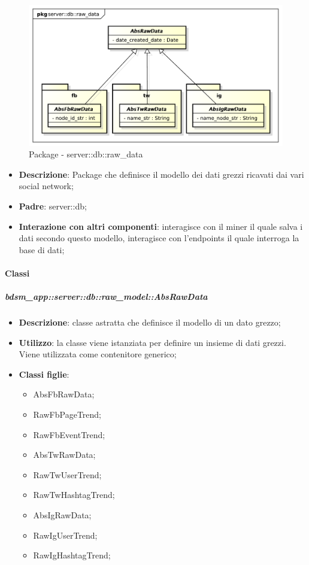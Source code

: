 	\begin{figure}[htbp]
		\centering
		\centerline{\includegraphics[scale=0.35]{./images/server/raw_data.pdf}}
		\caption{Package - server::db::raw\_data}
	\end{figure}
	\begin{itemize}
	\item \textbf{Descrizione}: Package che definisce il modello dei dati grezzi ricavati dai vari social network;
		\item \textbf{Padre}: server::db;
		\item \textbf{Interazione con altri componenti}: interagisce con il miner il quale salva i dati secondo questo modello, interagisce con l'endpoints il quale interroga la base di dati;
	\end{itemize}


	\paragraph{Classi} %
		

		\subparagraph{bdsm\_app::server::db::raw\_model::AbsRawData} %
		\label{subp:bdsm_app_server_raw_model_AbsRawData}
			\begin{itemize}
				\item \textbf{Descrizione}: classe astratta che definisce il modello di un dato grezzo;
				\item \textbf{Utilizzo}: la classe viene istanziata per definire un insieme di dati grezzi. Viene utilizzata come contenitore generico;
				\item \textbf{Classi figlie}:
					\begin{itemize}
						\item AbsFbRawData;
						\item RawFbPageTrend;
						\item RawFbEventTrend;
						\item AbsTwRawData;
						\item RawTwUserTrend;
						\item RawTwHashtagTrend;
						\item AbsIgRawData;
						\item RawIgUserTrend;
						\item RawIgHashtagTrend;
					\end{itemize}
			\end{itemize}


